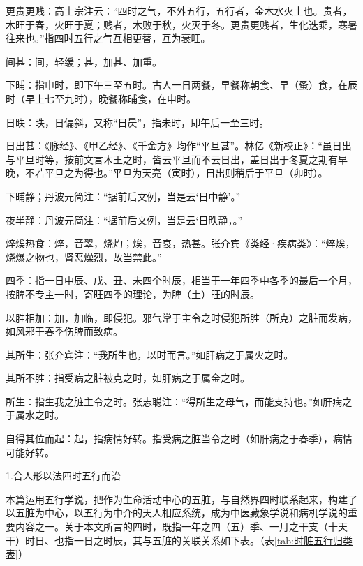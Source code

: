 \documentclass[12pt]{ctexbook}
\begin{document}
\begin{jiaozhu}
  \item 更贵更贱：高士宗注云：“四时之气，不外五行，五行者，金木水火土也。贵者，木旺于春，火旺于夏；贱者，木败于秋，火灭于冬。更贵更贱者，生化迭乘，寒暑往来也。”指四时五行之气互相更替，互为衰旺。
  \item 间甚：间，轻缓；甚，加甚、加重。
  \item 下晡：指申时，即下午三至五时。古人一日两餐，早餐称朝食、早（蚤）食，在辰时（早上七至九时），晚餐称晡食，在申时。
  \item 日昳：昳，日偏斜，又称“日昃”，指未时，即午后一至三时。
  \item 日出甚：《脉经》、《甲乙经》、《千金方》均作“平旦甚”。林亿《新校正》：“虽日出与平旦时等，按前文言木王之时，皆云平旦而不云日出，盖日出于冬夏之期有早晚，不若平旦之为得也。”平旦为天亮（寅时），日出则稍后于平旦（卯时）。
  \item 下晡静；丹波元简注：“据前后文例，当是云‘日中静’。”
  \item 夜半静：丹波元简注：“据前后文例，当是云‘日昳静，。”
  \item 焠㶼热食：焠，音翠，烧灼；㶼，音哀，热甚。张介宾《类经·疾病类》：“焠㶼，烧爆之物也，肾恶燥烈，故当禁此。”
  \item 四季：指一日中辰、戌、丑、未四个时辰，相当于一年四季中各季的最后一个月，按脾不专主一时，寄旺四季的理论，为脾（土）旺的时辰。
  \item 以胜相加：加，加临，即侵犯。邪气常于主令之时侵犯所胜（所克）之脏而发病，如风邪于春季伤脾而致病。
  \item 其所生：张介宾注：“我所生也，以时而言。”如肝病之于属火之时。
  \item 其所不胜：指受病之脏被克之时，如肝病之于属金之时。
  \item 所生：指生我之脏主令之时。张志聪注：“得所生之母气，而能支持也。”如肝病之于属水之时。
  \item 自得其位而起：起，指病情好转。指受病之脏当令之时（如肝病之于春季），病情可能好转。
\end{jiaozhu}


1.合人形以法四时五行而治

本篇运用五行学说，把作为生命活动中心的五脏，与自然界四时联系起来，构建了以五脏为中心，以五行为中介的天人相应系统，成为中医藏象学说和病机学说的重要内容之一。关于本文所言的四时，既指一年之四（五）季、一月之干支（十天干）时日、也指一日之时辰，其与五脏的关联关系如下表。（表\ref{tab:时脏五行归类表}）
\end{document}
